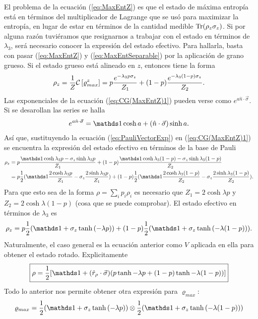 El problema de la ecuación (\ref{eq:MaxEntZ}) es que el estado de máxima entropía está en términos del multiplicador de Lagrange que se usó para maximizar la entropía, en lugar de estar en términos de la cantidad medible $\Tr(\rho_{z}\sigma_{z})$. Si por alguna razón tuviéramos que resignarnos a trabajar con el estado en términos de $\lambda_{3}$, será necesario conocer la expresión del estado efectivo. Para hallarla, basta con pasar (\ref{eq:MaxEntZ}) y (\ref{eq:MaxEntSeparable}) por la aplicación de grano grueso. Si el estado grueso está alineado en $z$, entonces tiene la forma
\begin{equation}\label{eq:CG(MaxEntZ)1}
    \rho_{z}=\frac{1}{Z}\mathcal{C}\left[\varrho_{max}^{z}\right]=p\frac{e^{-\lambda_{3}p\sigma_{z}}}{Z_{1}}+(1-p)\frac{e^{-\lambda_{3}(1-p)\sigma_{z}}}{Z_{2}}.
\end{equation}
Las exponenciales de la ecuación (\ref{eq:CG(MaxEntZ)1}) pueden verse como $e^{a\hat{n}\cdot \vec{\sigma}}$. Si se desarollan las series se halla
\begin{equation}\label{eq:PauliVectorExp}
    e^{a\hat{n}\cdot \vec{\sigma}}=\Id \cosh{a}+(\hat{n}\cdot \vec{\sigma})\sinh{a}.
\end{equation}
Así que, sustituyendo la ecuación (\ref{eq:PauliVectorExp}) en (\ref{eq:CG(MaxEntZ)1}) se encuentra la expresión del estado efectivo en términos de la base de Pauli
\begin{align*}
    \rho_{z}&=p\frac{\Id \cosh{\lambda_{3}p}-\sigma_{z}\sinh{\lambda_{3}p}}{Z_{1}}+(1-p)\frac{\Id \cosh{\lambda_{3}(1-p)}-\sigma_{z}\sinh{\lambda_{3}(1-p)}}{Z_{2}}\\
    &=p\frac{1}{2}(\Id \frac{2\cosh{\lambda_{3}p}}{Z_{1}}-\sigma_{z}\frac{2\sinh{\lambda_{3}p}}{Z_{1}})+(1-p)\frac{1}{2}(\Id \frac{2\cosh{\lambda_{3}(1-p)}}{Z_{2}}-\sigma_{z}\frac{2\sinh{\lambda_{3}(1-p)}}{Z_{2}}).
\end{align*}
Para que esto sea de la forma $\rho=\sum_{i}p_{i}\rho_{i}$ es necesario que $Z_{1}=2\cosh{\lambda p}$ y $Z_{2}=2\cosh{\lambda (1-p)}$ (cosa que se puede comprobar). El estado efectivo en términos de $\lambda_{3}$ es
\begin{equation}\label{eq:CG(MaxEntZ)2}
    \rho_{z}=p\frac{1}{2}(\Id+\sigma_{z}\tanh{(-\lambda p)})+(1-p)\frac{1}{2}(\Id+\sigma_{z}\tanh{(-\lambda (1-p))}).
\end{equation}
Naturalmente, el caso general es la ecuación anterior como $V$ aplicada en ella para obtener el estado rotado. Explicitamente
\begin{equation}\label{eq:CG(MaxEnt)}
  \boxed{\rho=\frac{1}{2}[\Id+(\hat{r}_{\rho}\cdot\vec{\sigma})(p\tanh{-\lambda p}+(1-p)\tanh{-\lambda (1-p)})]}
\end{equation}
Todo lo anterior nos permite obtener otra expresión para $\varrho_{max}$:
\begin{equation*}
  \varrho_{max}=\frac{1}{2}(\Id+\sigma_{z}\tanh{(-\lambda p)})\otimes\frac{1}{2}(\Id+\sigma_{z}\tanh{(-\lambda (1-p))})
\end{equation*}
